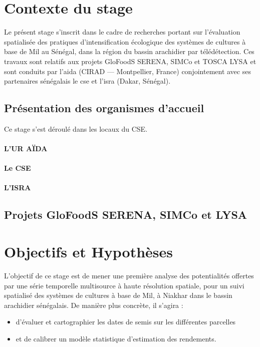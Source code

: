 \section{Contexte du stage}

Le présent stage s'inscrit dans le cadre de recherches portant sur l’évaluation spatialisée des pratiques d’intensification écologique des systèmes de cultures à base de Mil au 
Sénégal, dans la région du bassin arachidier par télédétection. Ces travaux sont relatifs aux projets GloFoodS SERENA, SIMCo et TOSCA LYSA et sont conduits par 
l'\acrshort{aida} (CIRAD --- Montpellier, France) conjointement avec ses partenaires sénégalais le \acrshort{cse} et l'\acrshort{isra} (Dakar, Sénégal).

  \subsection{Présentation des organismes d'accueil}
Ce stage s'est déroulé dans les locaux du CSE.
    
    \paragraph{L'UR AÏDA}
    
    \paragraph{Le CSE}
    
    \paragraph{L'ISRA}
    
  
  \subsection{Projets GloFoodS SERENA, SIMCo et LYSA}

\section{Objectifs et Hypothèses}

L'objectif de ce stage est de mener une première analyse des potentialités offertes par une série temporelle multisource à haute résolution spatiale, pour un suivi spatialisé des 
systèmes de cultures à base de Mil, à Niakhar dans le bassin arachidier sénégalais. De manière plus concrète, il s'agira :
  \begin{itemize}
   \item d'évaluer et cartographier les dates de semis sur les différentes parcelles
   \item et de calibrer un modèle statistique d'estimation des rendements.
  \end{itemize}
 
